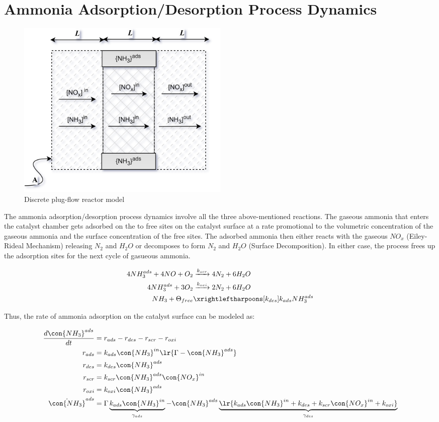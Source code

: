 \newpage
\section{Ammonia Adsorption/Desorption Process Dynamics}

\begin{figure}[H]
    \centering
    \includegraphics[width=0.5\textwidth]{./figs/scr_sys/plug_flow_discrete.png}
    \caption{Discrete plug-flow reactor model}
    \label{fig:plug_flow_discrete}
\end{figure}


The ammonia adsorption/desorption process dynamics involve all the three
above-mentioned reactions. The gaseous ammonia that enters the catalyst chamber
gets adsorbed on the to free sites on the catalyst surface at a rate
promotional to the volumetric concentration of the gaseous ammonia and the
surface concentration of the free sites. The adsorbed ammonia then either reacts
with the gaseous $NO_x$ (Eiley-Rideal Mechanism) releasing $N_2$ and $H_2O$ or
decomposes to form $N_2$ and $H_2O$ (Surface Decomposition). In either
case, the process frees up the adsorption sites for the next cycle of gasueous ammonia.

\begin{align}
    4 NH_3 ^{ads} + 4 NO + O_2 &\xrightarrow[]{k_{scr}} 4 N_2 + 6 H_2O \\
    4 NH_3^{ads} + 3 O_2 &\xrightarrow[]{k_{oxi}} 2 N_2 + 6 H_2O \\
    NH_3 + \Theta_{free} &\xrightleftharpoons[k_{des}]{k_{ads}} NH_3^{ads}
\end{align}


Thus, the rate of ammonia adsorption on the catalyst surface can be modeled as:

\begin{align}
    \frac{d \con{NH_3}^{ads}}{dt} &= r_{ads} - r_{des} - r_{scr} - r_{oxi}\\
    r_{ads} &= k_{ads} \con{NH_3}^{in} \lr{\Gamma - \con{NH_3}^{ads}}\\
    r_{des} &= k_{des} \con{NH_3}^{ads}\\
    r_{scr} &= k_{scr} \con{NH_3}^{ads} \con{NO_x}^{in}\\
    r_{oxi} &= k_{oxi} \con{NH_3}^{ads}\\
    \dot{\con{NH_3}}^{ads} &= \Gamma \underbrace{k_{ads} \con{NH_3}^{in}}_{\gamma_{ads}} - \con{NH_3}^{ads} \underbrace{\lr{k_{ads} \con{NH_3}^{in} + k_{des} + k_{scr} \con{NO_x}^{in} + k_{oxi}}}_{\gamma_{des}}
\end{align}

